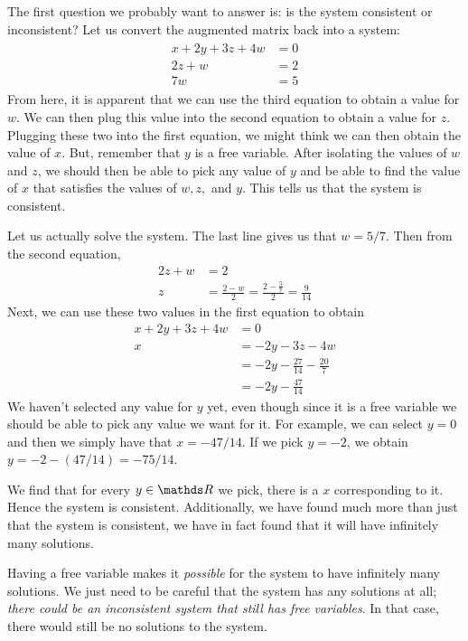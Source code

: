 \documentclass[11pt]{article}
\begin{document}
The first question we probably want to answer is: is the system consistent or inconsistent? Let us convert the augmented matrix back into a system:
\begin{align*}
\begin{aligned}
x + 2y + 3z + 4w &= 0
\\
2z + w &= 2
\\
7w &= 5
\end{aligned}
\end{align*}
From here, it is apparent that we can use the third equation to obtain a value for $w$. We can then plug this value into the second equation to obtain a value for $z$. Plugging these two into the first equation, we might think we can then obtain the value of $x$. But, remember that $y$ is a free variable. After isolating the values of $w$ and $z$, we should then be able to pick any value of $y$ and be able to find the value of $x$ that satisfies the values of $w,z,$ and $y$. This tells us that the system is consistent.

Let us actually solve the system. The last line gives us that $w = 5 / 7$. Then from the second equation,
\begin{align*}
2z + w &= 2
\\
z &= \frac{2-w}{2} = \frac{2 - \frac{5}{7}}{2} = \frac{9}{14}
\end{align*}
Next, we can use these two values in the first equation to obtain
\begin{align*}
x + 2y + 3z + 4w &= 0
\\
x &= -2y - 3z -4w
\\
&= -2y - \frac{27}{14} - \frac{20}{7}
\\
&= -2y - \frac{47}{14}
\end{align*}
We haven't selected any value for $y$ yet, even though since it is a free variable we should be able to pick any value we want for it. For example, we can select $y=0$ and then we simply have that $x = -47/14$. If we pick $y= -2$, we obtain $y=-2-(47/14) = -75/14$.

We find that for every $y \in \bbR$ we pick, there is a $x$ corresponding to it. Hence the system is consistent. Additionally, we have found much more than just that the system is consistent, we have in fact found that it will have infinitely many solutions.


Having a free variable makes it \emph{possible} for the system to have infinitely many solutions. We just need to be careful that the system has any solutions at all; \emph{there could be an inconsistent system that still has free variables}. In that case, there would still be no solutions to the system.
\end{document}
